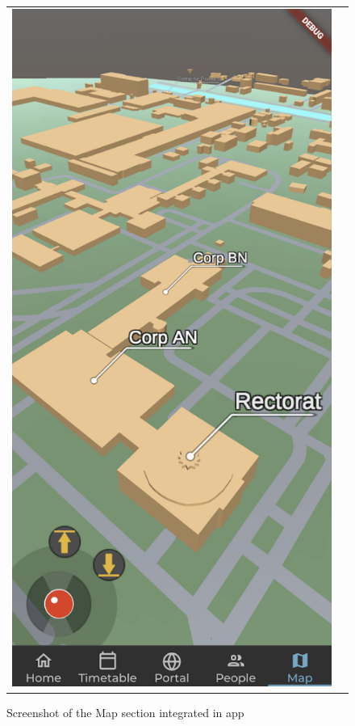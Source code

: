\begin{figure}
\begin{tabular}{@{}cc@{}}
                    \begin{minipage}[b]{0.41\textwidth} \includegraphics[width=\columnwidth]{figures/demos/maps_sdk_for_unity_flutter.png}
                        \caption{Screenshot of the Map section integrated in \gls{app}}   
                        \label{3:fig:maps_sdk_for_unity_flutter}
                    \end{minipage}
                \end{tabular}
            \end{figure}
        
